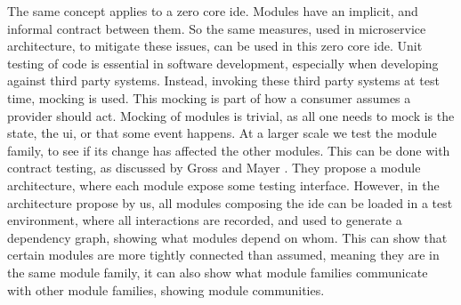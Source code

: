 The same concept applies to a zero core \gls{ide}. Modules have an implicit, and
informal contract between them. So the same measures, used in microservice
architecture, to mitigate these issues, can be used in this zero core \gls{ide}.
Unit testing of code is essential in software development, especially when
developing against third party systems. Instead, invoking these third party
systems at test time, mocking is used. This mocking is part of how a consumer
assumes a provider should act. Mocking of modules is trivial, as all one needs
to mock is the state, the \gls{ui}, or that some event happens. At a larger
scale we test the module family, to see if its change has affected the other
modules. This can be done with contract testing, as discussed by Gross and Mayer
\cite{GROSS200322}. They propose a module architecture, where each module expose
some testing interface. However, in the architecture propose by us, all modules
composing the \gls{ide} can be loaded in a test environment, where all
interactions are recorded, and used to generate a dependency graph, showing what
modules depend on whom. This can show that certain modules are more tightly
connected than assumed, meaning they are in the same module family, it can also
show what module families communicate with other module families, showing module
communities.
